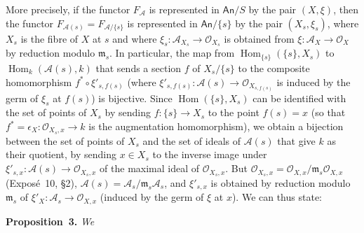 \documentclass[british]{article}
\newenvironment{itenv}[1]
  {\phantomsection\par\smallskip\noindent\textbf{#1.}\itshape}
  {\par\smallskip}
\newcommand{\oldpage}[1]{\marginpar{\footnotesize$\Big\vert$ \textit{p.~#1}}}
\begin{document}
More precisely, if the functor \(F_{\mathscr{A}}\) is represented in
\(\mathsf{An}/S\) by the pair \((X,\xi)\), then the functor
\(F_{{\mathscr{A}}(s)}=F_{{\mathscr{A}}/\{s\}}\) is represented in
\(\mathsf{An}/\{s\}\) by the pair \((X_s,\xi_s)\), where \(X_s\) is the
fibre of \(X\) at \(s\) and where
\(\xi_s\colon{\mathscr{A}}_{X_s}\to{\mathscr{O}}_{X_s}\) is obtained
from \(\xi\colon{\mathscr{A}}_X\to{\mathscr{O}}_X\) by reduction modulo
\({\mathfrak{m}}_s\). In particular, the map from
\(\operatorname{Hom}_{\{s\}}(\{s\},X_s)\) to
\(\operatorname{Hom}_k({\mathscr{A}}(s),k)\) that sends a section \(f\)
of \(X_s/\{s\}\) to the composite homomorphism \(f^*\circ\xi'_{s,f(s)}\)
(where
\(\xi'_{s,f(s)}\colon{\mathscr{A}}(s)\to{\mathscr{O}}_{X_{s,f(s)}}\) is
induced by the germ of \(\xi_s\) at \(f(s)\)) is bijective. Since
\(\operatorname{Hom}(\{s\},X_s)\) can be identified with the set of
points of \(X_s\) by sending \(f\colon\{s\}\to X_s\) to the point
\(f(s)=x\) (so that \(f^*=\epsilon_X\colon{\mathscr{O}}_{X_s,x}\to k\)
is the augmentation homomorphism), we obtain a bijection between the set
of points of \(X_s\) and the set of ideals of \({\mathscr{A}}(s)\) that
give \(k\) as their quotient, by sending \(x\in X_s\) to the inverse
image under \(\xi'_{s,x}\colon{\mathscr{A}}(s)\to{\mathscr{O}}_{X_s,x}\)
of the maximal ideal of \({\mathscr{O}}_{X_s,x}\). But
\({\mathscr{O}}_{X_s,x}={\mathscr{O}}_{X,x}/{\mathfrak{m}}_s{\mathscr{O}}_{X,x}\)
(Exposé~10, §2),
\({\mathscr{A}}(s)={\mathscr{A}}_s/{\mathfrak{m}}_s{\mathscr{A}}_s\),
and \(\xi'_{s,x}\) is obtained by reduction modulo \({\mathfrak{m}}_s\)
of \(\xi'_X\colon{\mathscr{A}}_s\to{\mathscr{O}}_{X,x}\) (induced by the
germ of \(\xi\) at \(x\)). We can thus state:

\oldpage{19-06}

\protect{}\label{proposition-3}
\begin{itenv}{Proposition 3}
We

\end{itenv}


\nocite{*}
\printbibliography[heading=bibintoc,title=Bibliography]
\end{document}
